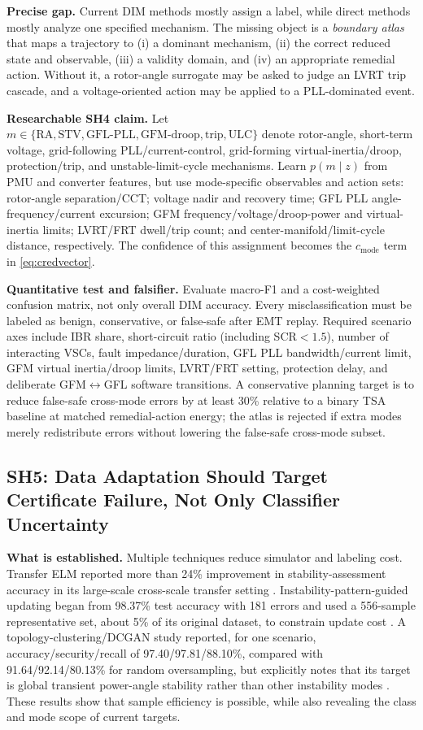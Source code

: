 \documentclass[conference]{IEEEtran}
\begin{document}
\textbf{Precise gap.} Current DIM methods mostly assign a label, while direct methods mostly analyze one specified mechanism. The missing object is a \emph{boundary atlas} that maps a trajectory to (i) a dominant mechanism, (ii) the correct reduced state and observable, (iii) a validity domain, and (iv) an appropriate remedial action. Without it, a rotor-angle surrogate may be asked to judge an LVRT trip cascade, and a voltage-oriented action may be applied to a PLL-dominated event.

\textbf{Researchable SH4 claim.} Let $m\in\{\mathrm{RA},\mathrm{STV},\mathrm{GFL\text{-}PLL},\mathrm{GFM\text{-}droop},\mathrm{trip},\mathrm{ULC}\}$ denote rotor-angle, short-term voltage, grid-following PLL/current-control, grid-forming virtual-inertia/droop, protection/trip, and unstable-limit-cycle mechanisms. Learn $p(m\mid z)$ from PMU and converter features, but use mode-specific observables and action sets: rotor-angle separation/CCT; voltage nadir and recovery time; GFL PLL angle-frequency/current excursion; GFM frequency/voltage/droop-power and virtual-inertia limits; LVRT/FRT dwell/trip count; and center-manifold/limit-cycle distance, respectively. The confidence of this assignment becomes the $c_{\mathrm{mode}}$ term in \eqref{eq:credvector}.

\textbf{Quantitative test and falsifier.} Evaluate macro-F1 and a cost-weighted confusion matrix, not only overall DIM accuracy. Every misclassification must be labeled as benign, conservative, or false-safe after EMT replay. Required scenario axes include IBR share, short-circuit ratio (including SCR$<1.5$), number of interacting VSCs, fault impedance/duration, GFL PLL bandwidth/current limit, GFM virtual inertia/droop limits, LVRT/FRT setting, protection delay, and deliberate GFM$\leftrightarrow$GFL software transitions. A conservative planning target is to reduce false-safe cross-mode errors by at least 30\% relative to a binary TSA baseline at matched remedial-action energy; the atlas is rejected if extra modes merely redistribute errors without lowering the false-safe cross-mode subset.

\subsection{SH5: Data Adaptation Should Target Certificate Failure, Not Only Classifier Uncertainty}

\textbf{What is established.} Multiple techniques reduce simulator and labeling cost. Transfer ELM reported more than 24\% improvement in stability-assessment accuracy in its large-scale cross-scale transfer setting \cite{ren2024telm}. Instability-pattern-guided updating began from 98.37\% test accuracy with 181 errors and used a 556-sample representative set, about 5\% of its original dataset, to constrain update cost \cite{wang2025update}. A topology-clustering/DCGAN study reported, for one scenario, accuracy/security/recall of 97.40/97.81/88.10\%, compared with 91.64/92.14/80.13\% for random oversampling, but explicitly notes that its target is global transient power-angle stability rather than other instability modes \cite{li2025samples}. These results show that sample efficiency is possible, while also revealing the class and mode scope of current targets.
\end{document}
